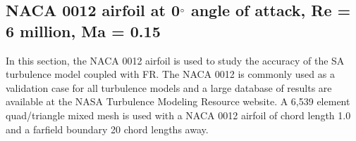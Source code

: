 \graphicspath{{figures_RANS_naca0012/}}%

\subsection{NACA 0012 airfoil at 0$^{\circ}$ angle of attack, Re = 6 million, Ma = 0.15}
In this section, the NACA 0012 airfoil is used to study the accuracy of the SA turbulence model coupled with FR. The NACA 0012 is commonly used as a validation case for all turbulence models and a large database of results are available at the NASA Turbulence Modeling Resource website. A 6,539 element quad/triangle mixed mesh is used with a NACA 0012 airfoil of chord length 1.0 and a farfield boundary 20 chord lengths away.
